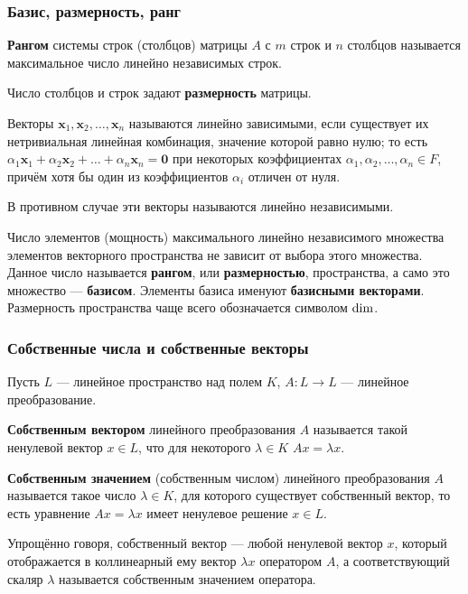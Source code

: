 \documentclass[12pt]{matmex-diploma}
\begin{document}
        \subsubsection*{Базис, размерность, ранг}
            \textbf{Рангом} системы строк (столбцов) матрицы $A$ с $m$ строк и $n$ столбцов называется максимальное число линейно независимых строк.
            
            Число столбцов и строк задают \textbf{размерность} матрицы.
            
            Векторы $\mathbf {x} _{1},\mathbf {x} _{2},\dots ,\mathbf {x} _{n}$ называются линейно зависимыми, если существует их нетривиальная линейная комбинация, значение которой равно нулю; то есть $\alpha _{1}\mathbf {x} _{1}+\alpha _{2}\mathbf {x} _{2}+\ldots +\alpha _{n}\mathbf {x} _{n}=\mathbf {0}$ при некоторых коэффициентах $\alpha _{1},\alpha _{2},\ldots ,\alpha _{n}\in F$, причём хотя бы один из коэффициентов $\alpha_i$ отличен от нуля.

            В противном случае эти векторы называются линейно независимыми.

            Число элементов (мощность) максимального линейно независимого множества элементов векторного пространства не зависит от выбора этого множества. Данное число называется \textbf{рангом}, или \textbf{размерностью}, пространства, а само это множество — \textbf{базисом}. Элементы базиса именуют \textbf{базисными векторами}. Размерность пространства чаще всего обозначается символом \textbf{${\rm {dim}}$}.

        \subsubsection*{Собственные числа и собственные векторы}
            Пусть $L$ — линейное пространство над полем $K$, $A\colon L\to L$ — линейное преобразование.

            \textbf{Собственным вектором} линейного преобразования $A$ называется такой ненулевой вектор $x\in L$, что для некоторого $\lambda \in K$ $Ax=\lambda x$.

            \textbf{Собственным значением} (собственным числом) линейного преобразования $A$ называется такое число $\lambda \in K$, для которого существует собственный вектор, то есть уравнение $Ax=\lambda x$ имеет ненулевое решение $x\in L$.

            Упрощённо говоря, собственный вектор — любой ненулевой вектор $x$, который отображается в коллинеарный ему вектор $\lambda x$ оператором $A$, а соответствующий скаляр $\lambda$ называется собственным значением оператора.
\end{document}
